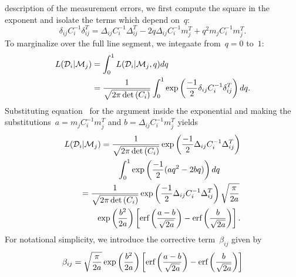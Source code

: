 \documentclass[ms.tex]{subfiles}
\begin{document}
description of the measurement errors, we first compute the square in the
exponent and isolate the terms which depend on~$q$:
\begin{equation}
\delta_{ij} C_i^{-1} \delta_{ij}^T = \Delta_{ij} C_i^{-1} \Delta_{ij}^T -
2q\Delta_{ij}C_i^{-1}m_j^T + q^2m_jC_i^{-1}m_j^T.
\label{eq:chisquared}
\end{equation}
To marginalize over the full line segment, we integaate from~$q = 0$ to~$1$:
\begin{subequations}\begin{align}
L(\mathcal{D}_i | \mathcal{M}_j) &= \int_0^1 L(\mathcal{D}_i | \mathcal{M}_j, q) dq
\\
&= \frac{1}{\sqrt{2\pi\det{(C_i)}}} \int_0^1 \exp \left(
\frac{-1}{2}\delta_{ij}C_i^{-1}\delta_{ij}^T
\right) dq.
\end{align}\end{subequations}
Substituting equation~ for the argument inside the
exponential and making the substitutions~$a = m_j C_i^{-1} m_j^T$ and
$b = \Delta_{ij} C_i^{-1} m_j^T$ yields
\begin{subequations}\begin{align}
\begin{split}
L(\mathcal{D}_i | \mathcal{M}_j) &= \frac{1}{\sqrt{2\pi \det{(C_i)}}}
\exp\left(\frac{-1}{2}\Delta_{ij} C_i^{-1} \Delta_{ij}^T\right)
\\
&\qquad \int_0^1 \exp\left(\frac{-1}{2}(aq^2 - 2bq)\right)dq
\end{split}
\\
\begin{split}
&= \frac{1}{\sqrt{2\pi\det{(C_i)}}}
\exp\left(\frac{-1}{2}\Delta_{ij}C_i^{-1}\Delta_{ij}^T\right)
\sqrt{\frac{\pi}{2a}}
\\
&\qquad \exp\left(\frac{b^2}{2a}\right)
\left[\text{erf}\left(\frac{a - b}{\sqrt{2a}}\right) - \text{erf}\left(\frac{b}{\sqrt{2a}}
\right)\right].
\end{split}
\end{align}\end{subequations}
For notational simplicity, we introduce the corrective term~$\beta_{ij}$ given
by
\begin{equation}
\beta_{ij} = \sqrt{\frac{\pi}{2a}} \exp\left(\frac{b^2}{2a}\right)
\left[\text{erf}\left(\frac{a - b}{\sqrt{2a}}\right) - \text{erf}\left(\frac{b}{\sqrt{2a}}
\right)\right]
\label{eq:corrective_beta}
\end{equation}
\end{document}
